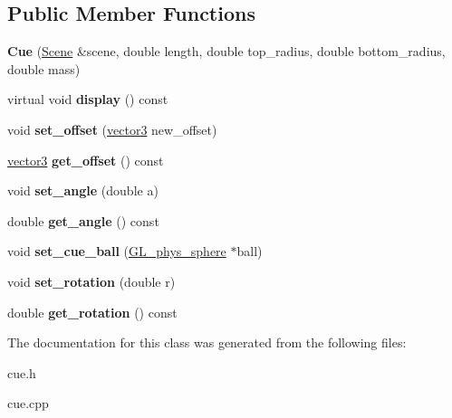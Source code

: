 \subsection*{Public Member Functions}
\begin{DoxyCompactItemize}
\item 
\hypertarget{class_cue_abe3d841321798f4a2f532135e1984147}{
{\bfseries Cue} (\hyperlink{class_scene}{Scene} \&scene, double length, double top\_\-radius, double bottom\_\-radius, double mass)}
\label{class_cue_abe3d841321798f4a2f532135e1984147}

\item 
\hypertarget{class_cue_ab11304d53f146f98d18521ceb68231ca}{
virtual void {\bfseries display} () const }
\label{class_cue_ab11304d53f146f98d18521ceb68231ca}

\item 
\hypertarget{class_cue_a57ba577fd2c745ef12c9390a4f593a61}{
void {\bfseries set\_\-offset} (\hyperlink{classvector3d}{vector3} new\_\-offset)}
\label{class_cue_a57ba577fd2c745ef12c9390a4f593a61}

\item 
\hypertarget{class_cue_ae9c680790d181fa30b4fbd05ab972470}{
\hyperlink{classvector3d}{vector3} {\bfseries get\_\-offset} () const }
\label{class_cue_ae9c680790d181fa30b4fbd05ab972470}

\item 
\hypertarget{class_cue_a544bb72ff05b1cac93e3b2cc6b1ec93a}{
void {\bfseries set\_\-angle} (double a)}
\label{class_cue_a544bb72ff05b1cac93e3b2cc6b1ec93a}

\item 
\hypertarget{class_cue_ad0d19a13457b6256461f0c953a592bbf}{
double {\bfseries get\_\-angle} () const }
\label{class_cue_ad0d19a13457b6256461f0c953a592bbf}

\item 
\hypertarget{class_cue_a66d1f8fee4867e73a759ce1bbc388297}{
void {\bfseries set\_\-cue\_\-ball} (\hyperlink{class_g_l__phys__sphere}{GL\_\-phys\_\-sphere} $\ast$ball)}
\label{class_cue_a66d1f8fee4867e73a759ce1bbc388297}

\item 
\hypertarget{class_cue_a911cbad73cafca6433896d8bddb8468e}{
void {\bfseries set\_\-rotation} (double r)}
\label{class_cue_a911cbad73cafca6433896d8bddb8468e}

\item 
\hypertarget{class_cue_a949cc372a773ea3812da726bf11c1239}{
double {\bfseries get\_\-rotation} () const }
\label{class_cue_a949cc372a773ea3812da726bf11c1239}

\end{DoxyCompactItemize}


The documentation for this class was generated from the following files:\begin{DoxyCompactItemize}
\item 
cue.h\item 
cue.cpp\end{DoxyCompactItemize}
